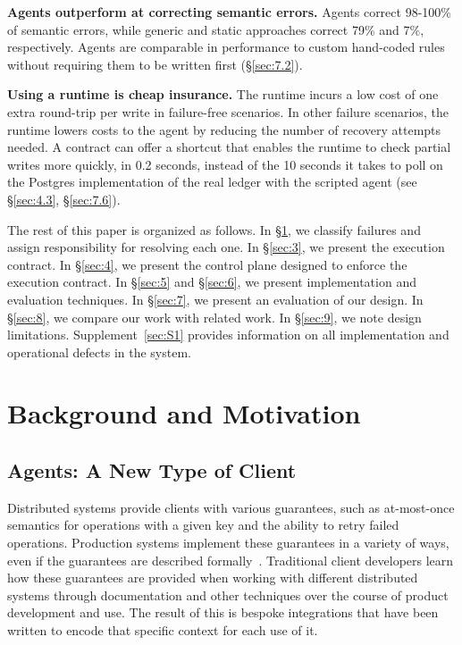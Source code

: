 \documentclass[letterpaper,twocolumn,10pt]{article}
\begin{document}
\textbf{Agents outperform at correcting semantic errors.} Agents correct 98-100\% of semantic errors, while generic and static approaches correct 79\% and 7\%, respectively. Agents are comparable in performance to custom hand-coded rules without requiring them to be written first (\S\ref{sec:7.2}).

\textbf{Using a runtime is cheap insurance.} The runtime incurs a low cost of one extra round-trip per write in failure-free scenarios. In other failure scenarios, the runtime lowers costs to the agent by reducing the number of recovery attempts needed. A contract can offer a shortcut that enables the runtime to check partial writes more quickly, in 0.2 seconds, instead of the 10 seconds it takes to poll on the Postgres implementation of the real ledger with the scripted agent (see \S\ref{sec:4.3}, \S\ref{sec:7.6}).

The rest of this paper is organized as follows. In \S\ref{sec:2}, we classify failures and assign responsibility for resolving each one. In \S\ref{sec:3}, we present the execution contract. In \S\ref{sec:4}, we present the control plane designed to enforce the execution contract. In \S\ref{sec:5} and \S\ref{sec:6}, we present implementation and evaluation techniques. In \S\ref{sec:7}, we present an evaluation of our design. In \S\ref{sec:8}, we compare our work with related work. In \S\ref{sec:9}, we note design limitations. Supplement~\ref{sec:S1} provides information on all implementation and operational defects in the system.

\section{Background and Motivation}\label{sec:2}

\subsection{Agents: A New Type of Client}\label{sec:2.1}

Distributed systems provide clients with various guarantees, such as at-most-once semantics for operations with a given key and the ability to retry failed operations. Production systems implement these guarantees in a variety of ways, even if the guarantees are described formally~\cite{kleppmann2017ddia}. Traditional client developers learn how these guarantees are provided when working with different distributed systems through documentation and other techniques over the course of product development and use. The result of this is bespoke integrations that have been written to encode that specific context for each use of it.
\end{document}
